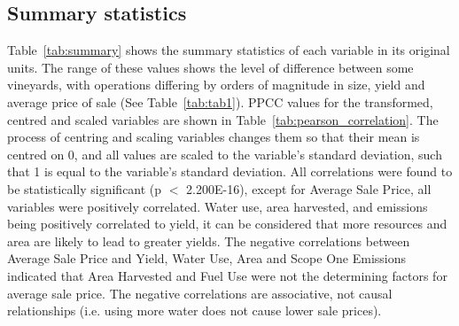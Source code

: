 \documentclass[10pt,letterpaper]{article}
\begin{document}
\subsection*{Summary statistics}\label{sec:exp_anal}
 Table~\ref{tab:summary} shows the summary statistics of each variable in its original units. The range of these values shows the level of difference between some vineyards, with operations differing by orders of magnitude in size, yield and average price of sale (See Table~\ref{tab:tab1}). PPCC values for the transformed, centred and scaled variables are shown in Table~\ref{tab:pearson_correlation}. The process of centring and scaling variables changes them so that their mean is centred on 0, and all values are scaled to the variable's standard deviation, such that 1 is equal to the variable's standard deviation. All correlations were found to be statistically significant (p $<$ 2.200E-16), except for Average Sale Price, all variables were positively correlated. Water use, area harvested, and emissions being positively correlated to yield, it can be considered that more resources and area are likely to lead to greater yields. The negative correlations between Average Sale Price and Yield, Water Use, Area and Scope One Emissions indicated that Area Harvested and Fuel Use were not the determining factors for average sale price. The negative correlations are associative, not causal relationships (i.e. using more water does not cause lower sale prices).
\end{document}
